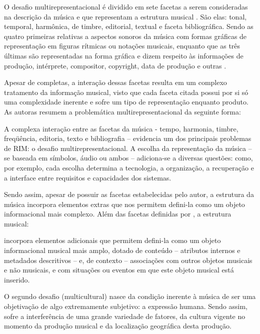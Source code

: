 O desafio multirepresentacional é dividido em sete facetas a serem consideradas na descrição da música e que representam a estrutura musical \cite{downie2003}. São elas: tonal, temporal, harmônica, de timbre, editorial, textual e faceta bibliográfica. Sendo as quatro primeiras relativas a aspectos sonoros da música com formas gráficas de representação em figuras rítmicas ou notações musicais, enquanto que as três últimas são representadas na forma gráfica e dizem respeito às informações de produção, intérprete, compositor, copyright, data de produção e outras \cite{barros2012}.

Apesar de completas, a interação dessas facetas resulta em um complexo tratamento da informação musical, visto que cada faceta citada possui por si só uma complexidade inerente e sofre um tipo de representação enquanto produto. As autoras  resumem a problemática multirepresentacional da seguinte forma:

\begin{citacao}
    A complexa interação entre as facetas da música - tempo, harmonia, timbre, freqüência, editoria, texto e bibliografia – evidencia um dos principais problemas de RIM: o desafio multirepresentacional. A escolha da representação da música – se baseada em símbolos, áudio ou ambos – adiciona-se a diversas questões: como, por exemplo, cada escolha determina a tecnologia, a organização, a recuperação e a interface entre requisitos e capacidades dos sistemas.
\end{citacao}

Sendo assim, apesar de possuir as facetas estabelecidas pelo autor, a estrutura da música incorpora elementos extras que nos permitem defini-la como um objeto informacional mais complexo. Além das facetas definidas por  , a estrutura musical:

\begin{citacao}
    [...] incorpora elementos adicionais que permitem defini-la como um objeto informacional musical mais amplo, dotado de conteúdo – atributos internos e metadados descritivos – e, de contexto – associações com outros objetos musicais e não musicais, e com situações ou eventos em que este objeto musical está inserido.
\end{citacao}

O segundo desafio (multicultural) nasce da condição inerente à música de ser uma objetivação de algo extremamente subjetivo: a expressão humana. Sendo assim, sofre a interferência de uma grande variedade de fatores, da cultura vigente no momento da produção musical e da localização geográfica desta produção.

